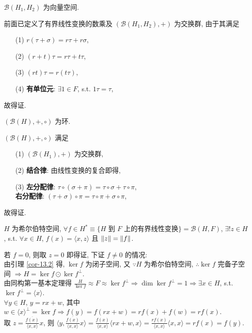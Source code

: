 \documentclass{note}
\begin{document}
$\mathcal{B}(H_1,H_2)$ 为向量空间.
\begin{pf}
    前面已定义了有界线性变换的数乘及 $(\mathcal{B}(H_1,H_2),+)$ 为交换群, 由于其满足
    \begin{itemize}
        \item[(1)] $r(\tau+\sigma)=r\tau+r\sigma$,
        \item[(2)] $(r+t)\tau=r\tau+t\tau$,
        \item[(3)] $(rt)\tau=r(t\tau)$,
        \item[(4)] \textbf{有单位元}: $\exists 1\in F$, s.t. $1\tau=\tau$,
    \end{itemize}
    故得证.
\end{pf}

$(\mathcal{B}(H),+,\circ)$ 为环.
\begin{pf}
    $(\mathcal{B}(H),+,\circ)$ 满足
    \begin{itemize}
        \item[(1)] $(\mathcal{B}(H_1),+)$ 为交换群,
        \item[(2)] \textbf{结合律}: 由线性变换的复合即得,
        \item[(3)] \textbf{左分配律}: $\tau\circ(\sigma+\pi)=\tau\circ\sigma+\tau\circ\pi$,\\
        \textbf{右分配律}: $(\tau+\sigma)\circ\pi=\tau\circ\pi+\sigma\circ\pi$,
    \end{itemize}
    故得证.
\end{pf}

\begin{thm}
    $H$ 为希尔伯特空间, $\forall f\in H^*\equiv\{H$ 到 $F$ 上的有界线性变换$\}=\mathcal{B}(H,F)$, $\exists!z\in H$, s.t. $\forall x\in H$, $f(x)=\langle x,z\rangle$ 且 $\left\lVert z\right\rVert=\left\lVert f\right\rVert$.
\end{thm}
\begin{pf}
    若 $f=0$, 则取 $z=0$ 即得证, 下证 $f\neq 0$ 的情况:\\
    由引理 \ref{cor-13.2} 得, $\ker f$ 为闭子空间, 又 $\because H$ 为希尔伯特空间, $\therefore\ker f$ 完备子空间 $\Longrightarrow H=\ker f\odot\ker f^{\perp}$.\\
    由同构第一基本定理得 $\frac{H}{\ker f}\approx F\approx\ker f^{\perp}\Longrightarrow\dim\ker f^{\perp}=1\Longrightarrow\exists x\in H$, s.t. $\ker f^{\perp}=\langle x\rangle$.\\
    $\forall y\in H$, $y=rx+w$, 其中 $w\in\langle x\rangle^{\perp}=\ker f\Longrightarrow f(y)=f(rx+w)=rf(x)+f(w)=rf(x)$.\\
    取 $z=\frac{\overline{f(x)}}{\langle x,x\rangle}x$, 则 $\langle y,\frac{\overline{f(x)}}{\langle x,x\rangle}x\rangle=\frac{f(x)}{\langle x,x\rangle}\langle rx+w,x\rangle=\frac{rf(x)}{\langle x,x\rangle}\langle x,x\rangle=rf(x)=f(y)$.
\end{pf}
\end{document}
